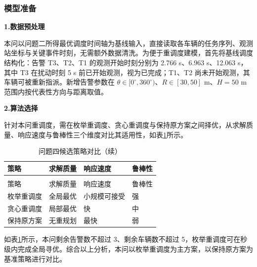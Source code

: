 
\subsubsection{模型准备}

\textbf{1.数据预处理}

本问以问题二所得最优调度时间轴为基线输入，直接读取各车辆的任务序列、观测站坐标与关键事件时刻，无需额外数据清洗。为便于重调度建模，首先将基线调度结构化：告警 T3、T2、T1 的观测开始时刻分别为 2.766 s、6.963 s、12.063 s，其中 T3 在扰动时刻 5 s 前已开始观测，视为已完成；T1、T2 尚未开始观测，其车辆可被重新指派。新增告警参数在 $\theta\in[0^\circ,360^\circ)$、$R\in[30,50]$ m、$H=50$ m 范围内按代表性方向与距离取值。

\textbf{2.算法选择}

针对本问重调度，需在枚举重调度、贪心重调度与保持原方案之间择优，从求解质量、响应速度与鲁棒性三个维度对比其适用性，如表\ref{tab:algo4}所示。

\begin{longtable}{>{\centering\arraybackslash}p{}>{\centering\arraybackslash}p{}>{\centering\arraybackslash}p{}>{\centering\arraybackslash}p{}}
  \caption{问题四候选策略对比}
  \label{tab:algo4} \\
  \toprule
  策略 & 求解质量 & 响应速度 & 鲁棒性 \\
  \midrule
  \endfirsthead
  \caption{问题四候选策略对比（续）} \\
  \toprule
  策略 & 求解质量 & 响应速度 & 鲁棒性 \\
  \midrule
  \endhead
  \bottomrule
  \endfoot
  枚举重调度 & 全局最优 & 小规模可接受 & 强 \\
  贪心重调度 & 局部最优 & 快 & 中 \\
  保持原方案 & 无重规划 & 最快 & 弱 \\
\end{longtable}

如表\ref{tab:algo4}所示，本问剩余告警数不超过 3、剩余车辆数不超过 5，枚举重调度可在秒级内完成全局寻优。综合以上分析，本问以枚举重调度为主方案，以保持原方案为基准策略进行对比。
